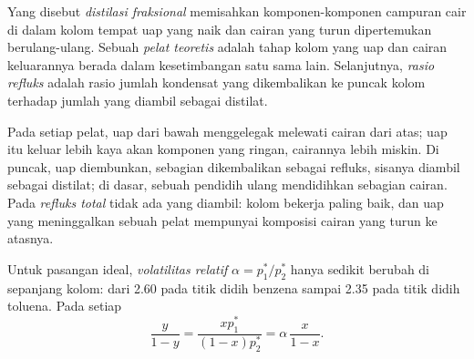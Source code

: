\begin{definition}\label{def:b2:liquid-vapour-diagrams:fractional-distillation}
Yang disebut \emph{distilasi fraksional}
memisahkan komponen-komponen campuran cair di dalam kolom tempat uap yang
naik dan cairan yang turun dipertemukan berulang-ulang. Sebuah
\emph{pelat teoretis} adalah tahap kolom yang uap
dan cairan keluarannya berada dalam kesetimbangan satu sama lain.
Selanjutnya, \emph{rasio refluks} adalah rasio
jumlah kondensat yang dikembalikan ke puncak kolom terhadap jumlah yang
diambil sebagai distilat.
\end{definition}

Pada setiap pelat, uap dari bawah menggelegak melewati cairan dari atas;
uap itu keluar lebih kaya akan komponen yang ringan, cairannya lebih
miskin. Di puncak, uap diembunkan, sebagian dikembalikan sebagai refluks,
sisanya diambil sebagai distilat; di dasar, sebuah pendidih ulang
mendidihkan sebagian cairan. Pada \textit{refluks total} tidak ada yang
diambil: kolom bekerja paling baik, dan uap yang meninggalkan sebuah pelat
mempunyai komposisi cairan yang turun ke atasnya.


Untuk pasangan ideal, \textit{volatilitas relatif} $\alpha = p_1^*/p_2^*$
hanya sedikit berubah di sepanjang kolom: dari 2.60 pada titik didih
benzena sampai 2.35 pada titik didih toluena. Pada setiap 
\[
  \frac{y}{1 - y} = \frac{xp_1^*}{(1 - x)p_2^*} = \alpha\,\frac{x}{1 - x} .
\]

